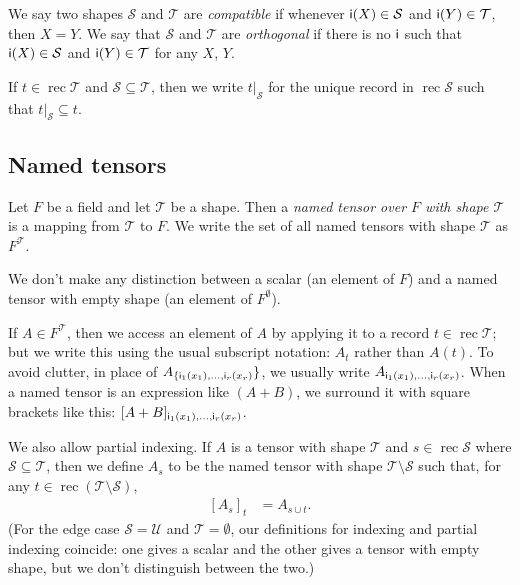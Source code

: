 \documentclass{article}
\DeclareMathOperator{\rec}{rec}
\newcommand{\restrict}[2]{\left.#1\right|_{#2}}
\begin{document}
We say two shapes $\mathcal{S}$ and $\mathcal{T}$ are \emph{compatible} if whenever $\mathsf{i}(X) \in \mathcal{S}$ and $\mathsf{i}(Y) \in \mathcal{T}$, then $X = Y$. We say that $\mathcal{S}$ and $\mathcal{T}$ are \emph{orthogonal} if there is no $\mathsf{i}$ such that $\mathsf{i}(X) \in \mathcal{S}$ and $\mathsf{i}(Y) \in \mathcal{T}$ for any $X$, $Y$.

If $t \in \rec \mathcal{T}$ and $\mathcal{S} \subseteq \mathcal{T}$, then we write $\restrict{t}{\mathcal{S}}$ for the unique record in $\rec \mathcal{S}$ such that $\restrict{t}{\mathcal{S}} \subseteq t$.

\subsection{Named tensors}

Let $F$ be a field and let $\mathcal{T}$ be a shape. Then a \emph{named tensor over $F$ with shape $\mathcal{T}$} is a mapping from $\mathcal{T}$ to $F$. We write the set of all named tensors with shape $\mathcal{T}$ as $F^{\mathcal{T}}$.

We don't make any distinction between a scalar (an element of $F$) and a named tensor with empty shape (an element of $F^\emptyset$).

If $A \in F^{\mathcal{T}}$, then we access an element of $A$ by applying it to a record $t \in \rec \mathcal{T}$; but we write this using the usual subscript notation: $A_t$ rather than $A(t)$. To avoid clutter, in place of $A_{\{\mathsf{i_\text{$1$}}(x_1), \ldots, \mathsf{i_\text{$r$}}(x_r)}\}$, we usually write $A_{\mathsf{i_\text{$1$}}(x_1), \ldots, \mathsf{i_\text{$r$}}(x_r)}$. When a named tensor is an expression like $(A+B)$, we surround it with square brackets like this: $[A+B]_{\mathsf{i_\text{$1$}}(x_1), \ldots, \mathsf{i_\text{$r$}}(x_r)}$.

We also allow partial indexing. If $A$ is a tensor with shape $\mathcal{T}$ and $s \in \rec \mathcal{S}$ where $\mathcal{S} \subseteq \mathcal{T}$, then we define $A_s$ to be the named tensor with shape $\mathcal{T} \setminus \mathcal{S}$ such that, for any $t \in \rec (\mathcal{T} \setminus \mathcal{S})$,
\begin{align*}
\left[A_s\right]_t &= A_{s \cup t}.
\end{align*}
(For the edge case $\mathcal{S} = \mathcal{U}$ and $\mathcal{T} = \emptyset$, our definitions for indexing and partial indexing coincide: one gives a scalar and the other gives a tensor with empty shape, but we don't distinguish between the two.)
\end{document}
